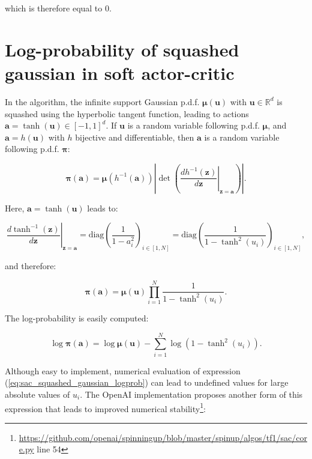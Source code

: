 which is therefore equal to $0$.

\section{Log-probability of squashed gaussian in soft actor-critic}

In the \sac algorithm, the infinite support Gaussian p.d.f. $\bm{\mu}(\bm{u})$ with $\bm{u} \in \mathbb{R}^d$ is squashed using the hyperbolic tangent function, leading to actions $\bm{a} = \tanh (\bm{u}) \in [-1,1]^d$. If $\bm{u}$ is a random variable following p.d.f. $\bm{\mu}$, and $\bm{a} = h(\bm{u})$ with $h$ bijective and differentiable, then $\bm{a}$ is a random variable following p.d.f. $\bm{\pi}$:

\begin{equation*}
	\bm{\pi}(\bm{a}) = \bm{\mu}\left( h^{-1}(\bm{a}) \right) \left| \det \left( \left. \frac{dh^{-1}(\bm{z})}{d\bm{z}} \right|_{\bm{z} = \bm{a}} \right) \right|.
\end{equation*}

Here, $\bm{a} = \tanh (\bm{u})$ leads to:

\begin{equation*}
	\left. \frac{d\tanh^{-1}(\bm{z})}{d\bm{z}} \right|_{\bm{z} = \bm{a}} = \text{diag} \left( \frac{1}{1-a_i^2} \right)_{i\in[1,N]} = \text{diag} \left( \frac{1}{1-\tanh^2(u_i)} \right)_{i\in[1,N]},
\end{equation*}

and therefore:

\begin{equation}
\label{eq:sac_squashed_gaussian}
	\bm{\pi}(\bm{a}) = \bm{\mu}\left( \bm{u} \right) \prod_{i=1}^{N} \frac{1}{1 - \tanh^2(u_i)}.
\end{equation}

The log-probability is easily computed:

\begin{equation}
\label{eq:sac_squashed_gaussian_logprob}
	\log \bm{\pi}(\bm{a}) = \log \bm{\mu}\left( \bm{u} \right) - \sum_{i=1}^{N} \log \left( 1 - \tanh^2(u_i) \right).
\end{equation}

Although easy to implement, numerical evaluation of expression (\ref{eq:sac_squashed_gaussian_logprob}) can lead to undefined values for large absolute values of $u_i$. The OpenAI implementation \cite{spinningup} proposes another form of this expression that leads to improved numerical stability\footnote{\url{https://github.com/openai/spinningup/blob/master/spinup/algos/tf1/sac/core.py} line 54}:

